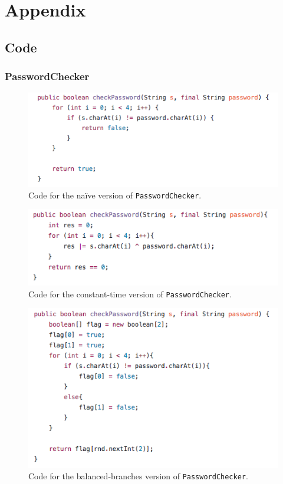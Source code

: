 \section{Appendix}

\subsection{Code}

\subsubsection{PasswordChecker}

\begin{figure}[h]
\includegraphics[width=.7\linewidth]{code/insecure.png}
\caption{Code for the na\"ive version of \texttt{PasswordChecker}.}

\end{figure}

\begin{figure}[h]
\includegraphics[width=.7\linewidth]{code/constant.png}
\caption{Code for the constant-time version of \texttt{PasswordChecker}.}

\end{figure}

\begin{figure}[h]
\includegraphics[width=.7\linewidth]{code/branches.png}
\caption{Code for the balanced-branches version of \texttt{PasswordChecker}.}

\end{figure}

